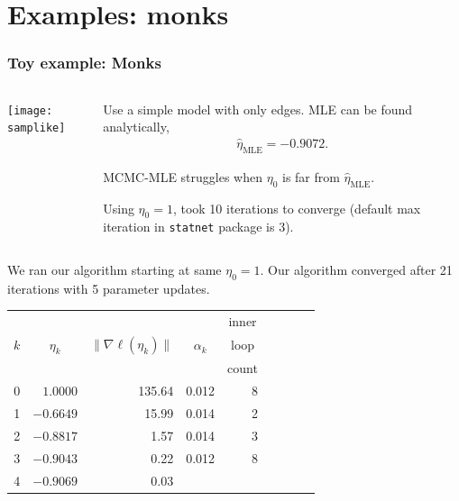 \documentclass[ 10pt]{beamer}
\newcommand{\etaMLE}{\hat{\eta}_{\textrm{MLE}}}
\begin{document}
\section{Examples: monks}
\frame
{
  \frametitle{Toy example: Monks}  

\begin{columns}[t]
\begin{column}[T]{0.3\textwidth}
\texttt{[image: samplike]}
\end{column}

\begin{column}[r]{0.7\textwidth}
Use a simple model with only edges.  MLE can be 
found analytically,
\begin{align*}
	\etaMLE = -0.9072.
\end{align*}

\pause
MCMC-MLE struggles when $\eta_0$ is far from $\etaMLE$.
\vspace{2mm}

Using $\eta_0 = 1$, took 10 iterations to converge (default max iteration in \texttt{statnet} package is 3).
\end{column}
\end{columns}

\pause
We ran our algorithm starting at same $\eta_0=1$.  Our algorithm converged
after 21 iterations with 5 parameter updates.
{\footnotesize
\begin{table}
\begin{center}
\begin{tabular}{rrrrrrlrr}
  \hline
    &  &  &  & \multicolumn{1}{c}{inner}\\
  \multicolumn{1}{c}{$k$} & 
  \multicolumn{1}{c}{$\eta_k$} &
  \multicolumn{1}{c}{$\lVert \nabla \ell(\eta_k) \rVert$} &
  \multicolumn{1}{c}{$\alpha_k$} &
  \multicolumn{1}{c}{loop }\\
    &  &  &  & \multicolumn{1}{c}{count}\\
  \hline
   0 &  $1.0000$ & 135.64 &  0.012 & 8\\
   1 & $-0.6649$ & 15.99  &  0.014 & 2 \\
   2 & $-0.8817$ & 1.57   &  0.014 & 3 \\
   3 & $-0.9043$ & 0.22   &  0.012 & 8 \\
   4 & $-0.9069$ & 0.03   &  &  \\
   \hline
\end{tabular} \label{T:Sampson redo}
\end{center}
\end{table}}
}
\end{document}
